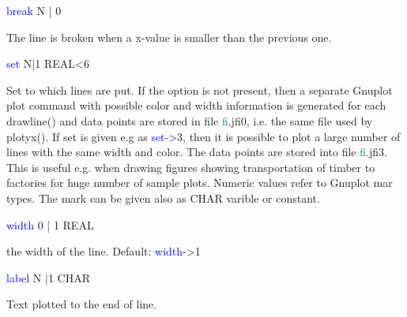 \vspace{0.3cm}
\hline
\vspace{0.3cm}
\noindent \textcolor{blue}{break}  \tabto{3cm}  N | 0  \tabto{5cm}    \tabto{7cm}
\begin{changemargin}{3cm}{0cm}
\noindent  The line is broken when a x-value is smaller than the previous one.
\end{changemargin}
\vspace{0.3cm}
\hline
\vspace{0.3cm}
\noindent \textcolor{blue}{set}  \tabto{3cm}  N|1  \tabto{5cm}   REAL<6  \tabto{7cm}
\begin{changemargin}{3cm}{0cm}
\noindent  Set to which lines are put. If the option is not present,
then a separate Gnuplot plot command with possible color and width information
is generated for each \textcolor{VioletRed}{drawline}() and data points are stored
in file \textcolor{teal}{fi}.jfi0, i.e. the same file used by \textcolor{VioletRed}{plotyx}().
If set is given e.g as \textcolor{blue}{set->}3, then it is possible to plot a large number of lines
with the same width and color. The data points are stored into file \textcolor{teal}{fi}.jfi3. This is
useful e.g. when drawing figures showing transportation of timber to factories
for huge number of sample plots.
Numeric values refer to Gnuplot mar types.
The mark can be given also as CHAR varible or constant.
\end{changemargin}
\vspace{0.3cm}
\hline
\vspace{0.3cm}
\noindent \textcolor{blue}{width}  \tabto{3cm}  0 | 1  \tabto{5cm}   REAL  \tabto{7cm}
\begin{changemargin}{3cm}{0cm}
\noindent  the width of the line. Default: \textcolor{blue}{width->}1
\end{changemargin}
\vspace{0.3cm}
\hline
\vspace{0.3cm}
\noindent \textcolor{blue}{label} \tabto{3cm}  N |1  \tabto{5cm}  CHAR  \tabto{7cm}
\begin{changemargin}{3cm}{0cm}
\noindent  Text plotted to the end of line.
\end {changemargin}
\hline
\vspace{0.2cm}
